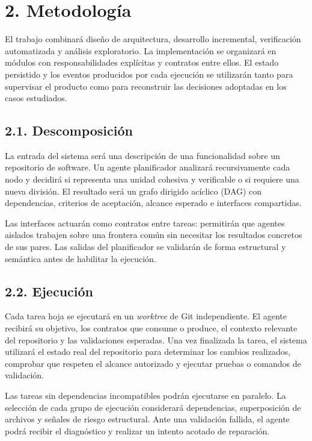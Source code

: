 \documentclass[11pt,a4paper]{article}
\begin{document}
\section*{2. Metodolog\'ia}

El trabajo combinar\'a dise\~no de arquitectura, desarrollo incremental,
verificaci\'on automatizada y an\'alisis exploratorio. La implementaci\'on se
organizar\'a en m\'odulos con responsabilidades expl\'icitas y contratos entre
ellos. El estado persistido y los eventos producidos por cada ejecuci\'on se
utilizar\'an tanto para supervisar el producto como para reconstruir las
decisiones adoptadas en los casos estudiados.

\subsection*{2.1. Descomposici\'on}

La entrada del sistema ser\'a una descripci\'on de una funcionalidad sobre un
repositorio de software. Un agente planificador analizar\'a recursivamente cada
nodo y decidir\'a si representa una unidad cohesiva y verificable o si requiere
una nueva divisi\'on. El resultado ser\'a un grafo dirigido ac\'iclico (DAG) con
dependencias, criterios de aceptaci\'on, alcance esperado e interfaces
compartidas.

Las interfaces actuar\'an como contratos entre tareas: permitir\'an que agentes
aislados trabajen sobre una frontera com\'un sin necesitar los resultados
concretos de sus pares. Las salidas del planificador se validar\'an de forma
estructural y sem\'antica antes de habilitar la ejecuci\'on.

\subsection*{2.2. Ejecuci\'on}

Cada tarea hoja se ejecutar\'a en un \emph{worktree} de Git independiente. El
agente recibir\'a su objetivo, los contratos que consume o produce, el contexto
relevante del repositorio y las validaciones esperadas. Una vez finalizada la
tarea, el sistema utilizar\'a el estado real del repositorio para determinar los
cambios realizados, comprobar que respeten el alcance autorizado y ejecutar
pruebas o comandos de validaci\'on.

Las tareas sin dependencias incompatibles podr\'an ejecutarse en paralelo. La
selecci\'on de cada grupo de ejecuci\'on considerar\'a dependencias, superposici\'on
de archivos y se\~nales de riesgo estructural. Ante una validaci\'on fallida, el
agente podr\'a recibir el diagn\'ostico y realizar un intento acotado de
reparaci\'on.
\end{document}
